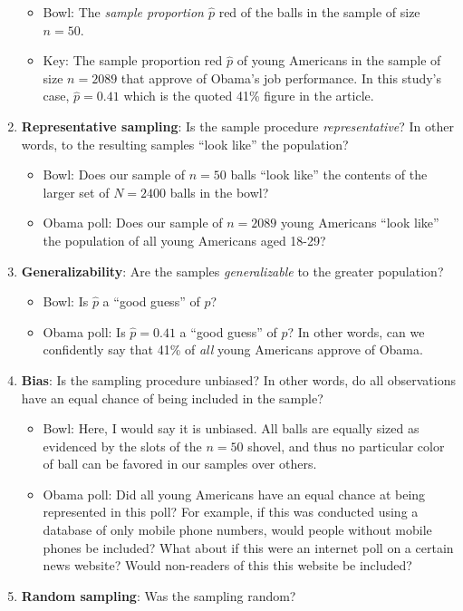 \documentclass[12pt,]{krantz}
\providecommand{\tightlist}{%
  \setlength{\itemsep}{0pt}\setlength{\parskip}{0pt}}
\theoremstyle{definition}
\theoremstyle{definition}
\theoremstyle{definition}
\theoremstyle{remark}
\begin{document}
\begin{enumerate}
  \begin{itemize}
  \tightlist
  \item
    Bowl: The \emph{sample proportion \(\widehat{p}\)} red of the balls
    in the sample of size \(n=50\).
  \item
    Key: The sample proportion red \(\widehat{p}\) of young Americans in
    the sample of size \(n=2089\) that approve of Obama's job
    performance. In this study's case, \(\widehat{p} = 0.41\) which is
    the quoted 41\% figure in the article.
  \end{itemize}
\item
  \textbf{Representative sampling}: Is the sample procedure
  \emph{representative}? In other words, to the resulting samples ``look
  like'' the population?

  \begin{itemize}
  \tightlist
  \item
    Bowl: Does our sample of \(n=50\) balls ``look like'' the contents
    of the larger set of \(N=2400\) balls in the bowl?
  \item
    Obama poll: Does our sample of \(n=2089\) young Americans ``look
    like'' the population of all young Americans aged 18-29?
  \end{itemize}
\item
  \textbf{Generalizability}: Are the samples \emph{generalizable} to the
  greater population?

  \begin{itemize}
  \tightlist
  \item
    Bowl: Is \(\widehat{p}\) a ``good guess'' of \(p\)?
  \item
    Obama poll: Is \(\widehat{p} = 0.41\) a ``good guess'' of \(p\)? In
    other words, can we confidently say that 41\% of \emph{all} young
    Americans approve of Obama.
  \end{itemize}
\item
  \textbf{Bias}: Is the sampling procedure unbiased? In other words, do
  all observations have an equal chance of being included in the sample?

  \begin{itemize}
  \tightlist
  \item
    Bowl: Here, I would say it is unbiased. All balls are equally sized
    as evidenced by the slots of the \(n=50\) shovel, and thus no
    particular color of ball can be favored in our samples over others.
  \item
    Obama poll: Did all young Americans have an equal chance at being
    represented in this poll? For example, if this was conducted using a
    database of only mobile phone numbers, would people without mobile
    phones be included? What about if this were an internet poll on a
    certain news website? Would non-readers of this this website be
    included?
  \end{itemize}
\item
  \textbf{Random sampling}: Was the sampling random?


\end{enumerate}
\end{document}
